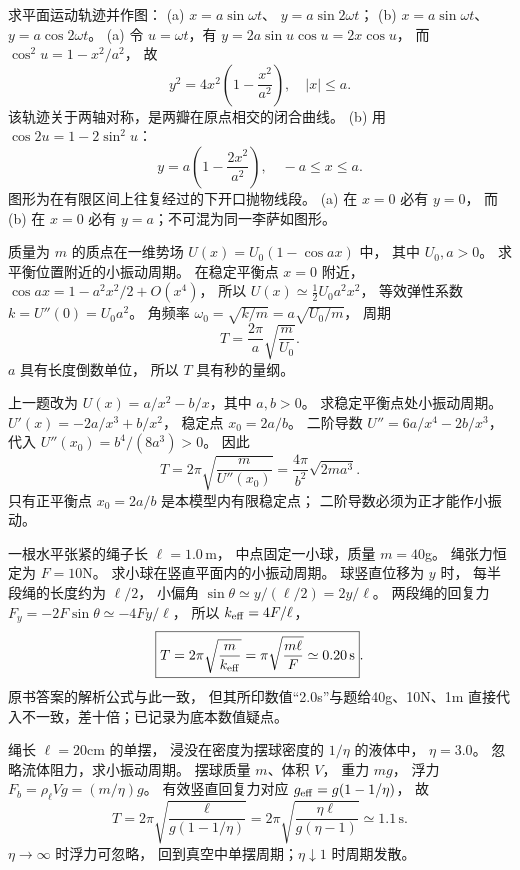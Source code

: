 求平面运动轨迹并作图：
(a) $x=a\sin\omega t$、
$y=a\sin2\omega t$；
(b) $x=a\sin\omega t$、
$y=a\cos2\omega t$。
\exsolution
(a) 令 $u=\omega t$，有
$y=2a\sin u\cos u=2x\cos u$，
而 $\cos^2u=1-x^2/a^2$，
故
\[
\boxed{y^2=4x^2\left(1-\frac{x^2}{a^2}\right)},
\quad |x|\le a.
\]
该轨迹关于两轴对称，是两瓣在原点相交的闭合曲线。
(b) 用
$\cos2u=1-2\sin^2u$：
\[
\boxed{y=a\left(1-\frac{2x^2}{a^2}\right)},
\quad -a\le x\le a.
\]
图形为在有限区间上往复经过的下开口抛物线段。
\excheck (a) 在 $x=0$ 必有 $y=0$，
而 (b) 在 $x=0$ 必有 $y=a$；不可混为同一李萨如图形。

质量为 $m$ 的质点在一维势场
$U(x)=U_0(1-\cos ax)$ 中，
其中 $U_0,a>0$。
求平衡位置附近的小振动周期。
\exsolution
在稳定平衡点 $x=0$ 附近，
$\cos ax=1-a^2x^2/2+O(x^4)$，
所以
$U(x)\simeq \tfrac12U_0a^2x^2$，
等效弹性系数
$k=U''(0)=U_0a^2$。
角频率
$\omega_0=\sqrt{k/m}=a\sqrt{U_0/m}$，
周期
\[
\boxed{T=\frac{2\pi}{a}\sqrt{\frac m{U_0}}}.
\]
\excheck $a$ 具有长度倒数单位，
所以 $T$ 具有秒的量纲。

上一题改为
$U(x)=a/x^2-b/x$，其中 $a,b>0$。
求稳定平衡点处小振动周期。
\exsolution
$U'(x)=-2a/x^3+b/x^2$，
稳定点
$x_0=2a/b$。
二阶导数
$U''=6a/x^4-2b/x^3$，
代入
$U''(x_0)=b^4/(8a^3)>0$。
因此
\[
\boxed{T=2\pi\sqrt{\frac{m}{U''(x_0)}}
=\frac{4\pi}{b^2}\sqrt{2ma^3}}.
\]
\excheck 只有正平衡点 $x_0=2a/b$
是本模型内有限稳定点；
二阶导数必须为正才能作小振动。

一根水平张紧的绳子长
$\ell=1.0\,\mathrm m$，
中点固定一小球，质量 $m=40$g。
绳张力恒定为 $F=10$N。
求小球在竖直平面内的小振动周期。
\exsolution
球竖直位移为 $y$ 时，
每半段绳的长度约为 $\ell/2$，
小偏角
$\sin\theta\simeq y/(\ell/2)=2y/\ell$。
两段绳的回复力
$F_y=-2F\sin\theta\simeq-4Fy/\ell$，
所以
$k_{\rm eff}=4F/\ell$，
\[
\boxed{T=2\pi\sqrt{\frac m{k_{\rm eff}}}
=\pi\sqrt{\frac{m\ell}{F}}
\simeq0.20\,\mathrm s}.
\]
\excheck 原书答案的解析公式与此一致，
但其所印数值“2.0s”与题给40g、10N、1m
直接代入不一致，差十倍；已记录为底本数值疑点。

绳长 $\ell=20$cm 的单摆，
浸没在密度为摆球密度的 $1/\eta$ 的液体中，
$\eta=3.0$。
忽略流体阻力，求小振动周期。
\exsolution
摆球质量 $m$、体积 $V$，
重力 $mg$，
浮力
$F_b=\rho_\ell Vg=(m/\eta)g$。
有效竖直回复力对应
$g_{\rm eff}=g(1-1/\eta)$，
故
\[
\boxed{T=2\pi\sqrt{
\frac{\ell}{g(1-1/\eta)}}
=2\pi\sqrt{\frac{\eta\ell}{g(\eta-1)}}
\simeq1.1\,\mathrm s}.
\]
\excheck $\eta\to\infty$ 时浮力可忽略，
回到真空中单摆周期；$\eta\downarrow1$ 时周期发散。

